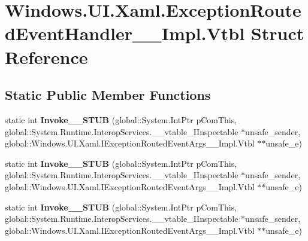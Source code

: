\hypertarget{struct_windows_1_1_u_i_1_1_xaml_1_1_exception_routed_event_handler_____impl_1_1_vtbl}{}\section{Windows.\+U\+I.\+Xaml.\+Exception\+Routed\+Event\+Handler\+\_\+\+\_\+\+Impl.\+Vtbl Struct Reference}
\label{struct_windows_1_1_u_i_1_1_xaml_1_1_exception_routed_event_handler_____impl_1_1_vtbl}
\subsection*{Static Public Member Functions}
\begin{DoxyCompactItemize}
\item 
\mbox{\label{struct_windows_1_1_u_i_1_1_xaml_1_1_exception_routed_event_handler_____impl_1_1_vtbl_a9391833cb0ee6b57ff38913cca292b7c}} 
static int {\bfseries Invoke\+\_\+\+\_\+\+S\+T\+UB} (global\+::\+System.\+Int\+Ptr p\+Com\+This, global\+::\+System.\+Runtime.\+Interop\+Services.\+\_\+\+\_\+vtable\+\_\+\+I\+Inspectable $\ast$unsafe\+\_\+sender, global\+::\+Windows.\+U\+I.\+Xaml.\+I\+Exception\+Routed\+Event\+Args\+\_\+\+\_\+\+Impl.\+Vtbl $\ast$$\ast$unsafe\+\_\+e)
\item 
\mbox{\label{struct_windows_1_1_u_i_1_1_xaml_1_1_exception_routed_event_handler_____impl_1_1_vtbl_a9391833cb0ee6b57ff38913cca292b7c}} 
static int {\bfseries Invoke\+\_\+\+\_\+\+S\+T\+UB} (global\+::\+System.\+Int\+Ptr p\+Com\+This, global\+::\+System.\+Runtime.\+Interop\+Services.\+\_\+\+\_\+vtable\+\_\+\+I\+Inspectable $\ast$unsafe\+\_\+sender, global\+::\+Windows.\+U\+I.\+Xaml.\+I\+Exception\+Routed\+Event\+Args\+\_\+\+\_\+\+Impl.\+Vtbl $\ast$$\ast$unsafe\+\_\+e)
\item 
\mbox{\label{struct_windows_1_1_u_i_1_1_xaml_1_1_exception_routed_event_handler_____impl_1_1_vtbl_a9391833cb0ee6b57ff38913cca292b7c}} 
static int {\bfseries Invoke\+\_\+\+\_\+\+S\+T\+UB} (global\+::\+System.\+Int\+Ptr p\+Com\+This, global\+::\+System.\+Runtime.\+Interop\+Services.\+\_\+\+\_\+vtable\+\_\+\+I\+Inspectable $\ast$unsafe\+\_\+sender, global\+::\+Windows.\+U\+I.\+Xaml.\+I\+Exception\+Routed\+Event\+Args\+\_\+\+\_\+\+Impl.\+Vtbl $\ast$$\ast$unsafe\+\_\+e)
$$
\end{DoxyCompactItemize}
